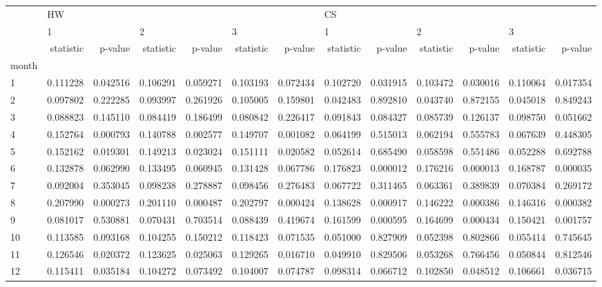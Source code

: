 \begin{tabular}{lrrrrrrrrrrrr}
\toprule
{} & \multicolumn{6}{l}{HW} & \multicolumn{6}{l}{CS} \\
{} & \multicolumn{2}{l}{1} & \multicolumn{2}{l}{2} & \multicolumn{2}{l}{3} & \multicolumn{2}{l}{1} & \multicolumn{2}{l}{2} & \multicolumn{2}{l}{3} \\
{} & statistic &   p-value & statistic &   p-value & statistic &   p-value & statistic &   p-value & statistic &   p-value & statistic &   p-value \\
month &           &           &           &           &           &           &           &           &           &           &           &           \\
\midrule
1     &  0.111228 &  0.042516 &  0.106291 &  0.059271 &  0.103193 &  0.072434 &  0.102720 &  0.031915 &  0.103472 &  0.030016 &  0.110064 &  0.017354 \\
2     &  0.097802 &  0.222285 &  0.093997 &  0.261926 &  0.105005 &  0.159801 &  0.042483 &  0.892810 &  0.043740 &  0.872155 &  0.045018 &  0.849243 \\
3     &  0.088823 &  0.145110 &  0.084419 &  0.186499 &  0.080842 &  0.226417 &  0.091843 &  0.084327 &  0.085739 &  0.126137 &  0.098750 &  0.051662 \\
4     &  0.152764 &  0.000793 &  0.140788 &  0.002577 &  0.149707 &  0.001082 &  0.064199 &  0.515013 &  0.062194 &  0.555783 &  0.067639 &  0.448305 \\
5     &  0.152162 &  0.019301 &  0.149213 &  0.023024 &  0.151111 &  0.020582 &  0.052614 &  0.685490 &  0.058598 &  0.551486 &  0.052288 &  0.692788 \\
6     &  0.132878 &  0.062990 &  0.133495 &  0.060945 &  0.131428 &  0.067786 &  0.176823 &  0.000012 &  0.176216 &  0.000013 &  0.168787 &  0.000035 \\
7     &  0.092004 &  0.353045 &  0.098238 &  0.278887 &  0.098456 &  0.276483 &  0.067722 &  0.311465 &  0.063361 &  0.389839 &  0.070384 &  0.269172 \\
8     &  0.207990 &  0.000273 &  0.201110 &  0.000487 &  0.202797 &  0.000424 &  0.138628 &  0.000917 &  0.146222 &  0.000386 &  0.146316 &  0.000382 \\
9     &  0.081017 &  0.530881 &  0.070431 &  0.703514 &  0.088439 &  0.419674 &  0.161599 &  0.000595 &  0.164699 &  0.000434 &  0.150421 &  0.001757 \\
10    &  0.113585 &  0.093168 &  0.104255 &  0.150212 &  0.118423 &  0.071535 &  0.051000 &  0.827909 &  0.052398 &  0.802866 &  0.055414 &  0.745645 \\
11    &  0.126546 &  0.020372 &  0.123625 &  0.025063 &  0.129265 &  0.016710 &  0.049910 &  0.829506 &  0.053268 &  0.766456 &  0.050844 &  0.812546 \\
12    &  0.115411 &  0.035184 &  0.104272 &  0.073492 &  0.104007 &  0.074787 &  0.098314 &  0.066712 &  0.102850 &  0.048512 &  0.106661 &  0.036715 \\
\bottomrule
\end{tabular}
